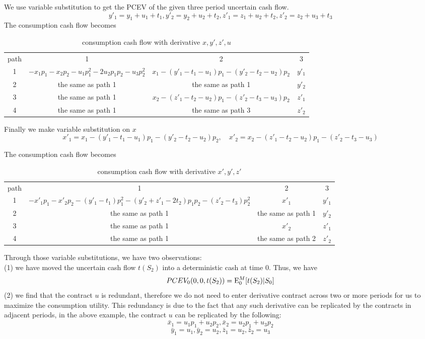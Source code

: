 We use variable substitution to get the PCEV of the given three period uncertain cash flow. 
\[y'_1 = y_1 + u_1 + t_1, y'_2 = y_2 + u_2 + t_2, z'_1 = z_1 + u_2 + t_2, z'_2 = z_2 + u_3 + t_3 \]
The consumption cash flow becomes
\begin{table}[htdp]
\begin{center}\begin{tabular}{cccc} path & 1 & 2 & 3 \\ 1 &$-x_1p_1 - x_2p_2 - u_1p_1^2 -2u_2p_1p_2 - u_3p^2_2$ & $x_1 - (y'_1 - t_1 - u_1) p_1 - (y'_2-t_2-u_2) p_2$ & $y'_1 $ \\2& the same as path 1 & the same as path 1 & $y'_2 $ \\3 & the same as path 1 & $x_2  - (z'_1-t_2-u_2) p_1-(z'_2-t_3-u_3) p_2$ & $z'_1 $ \\4 & the same as path 1 & the same as path 3 & $z'_2 $ \end{tabular} \caption{consumption cash flow with derivative $x,y',z', u$}
\end{center}
\label{table-y'z'}
\end{table}

Finally we make variable substitution on $x$
\[x'_1 = x_1 - (y'_1 - t_1 - u_1)p_1 - (y'_2 - t_2 - u_2)p_2,\quad x'_2 = x_2 - (z'_1 - t_2 - u_2)p_1 - (z'_2-t_3-u_3) \]

The consumption cash flow becomes

\begin{table}[htdp]
\begin{center}\begin{tabular}{cccc} path & 1 & 2 & 3 \\ 1 &$-x'_1p_1 - x'_2p_2 - (y'_1- t_1)p_1^2 -(y'_2+z'_1-2t_2) p_1p_2 - (z'_2 -t_3) p^2_2$ & $x'_1 $ & $y'_1 $ \\2& the same as path 1 & the same as path 1 & $y'_2 $ \\3 & the same as path 1 & $x'_2  $ & $z'_1 $ \\4 & the same as path 1 & the same as path 2 & $z'_2 $ \end{tabular} \caption{consumption cash flow with derivative $x',y',z'$}
\end{center}
\label{table-x'y'z'}
\end{table}
Through those variable substitutions, we have two observations:\\
(1) we have moved the uncertain cash flow $t(S_2)$ into a deterministic cash at time 0. Thus, we have
\[PCEV_0(0,0,t(S_2)) = \mathrm{E}_0^M[t(S_2)|S_0] \]
(2) we find that the contract $u$ is redundant, therefore we do not need to enter derivative contract across two or more periods for us to maximize the consumption utility. This redundancy is due to the fact that any such derivative can be replicated by the contracts in adjacent periods, in the above example, the contract $u$ can be replicated by the following:
\[ \bar{x}_1 = u_1p_1 + u_2p_2, \bar{x}_2 = u_2p_1 + u_3p_2 \] 
\[\bar{y}_1 = u_1, \bar{y}_2 = u_2, \bar{z}_1 = u_2, \bar{z}_2 = u_3 \]

